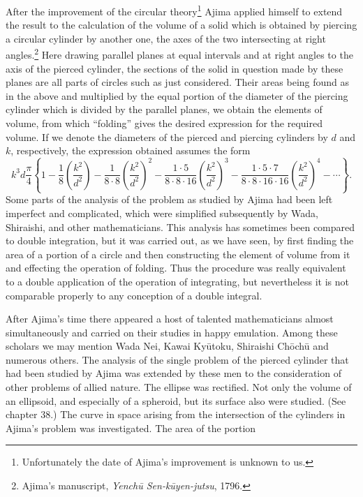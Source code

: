 \documentclass[11pt]{article}
\newcommand{\scanfooter}{}
\begin{document}
After the improvement of the circular theory\footnote{Unfortunately the date of Ajima's improvement is unknown to us.} Ajima applied himself to extend the result to the calculation of the volume of a solid which is obtained by piercing a circular cylinder by another one, the axes of the two intersecting at right angles.\footnote{Ajima's manuscript, \emph{Yenchū Sen-kūyen-jutsu}, 1796.} Here drawing parallel planes at equal intervals and at right angles to the axis of the pierced cylinder, the sections of the solid in question made by these planes are all parts of circles such as just considered. Their areas being found as in the above and multiplied by the equal portion of the diameter of the piercing cylinder which is divided by the parallel planes, we obtain the elements of volume, from which ``folding'' gives the desired expression for the required volume. If we denote the diameters of the pierced and piercing cylinders by $d$ and $k$, respectively, the expression obtained assumes the form
\[
k^3d\frac{\pi}{4}\left\{1-\frac18\left(\frac{k^2}{d^2}\right)
-\frac1{8\cdot8}\left(\frac{k^2}{d^2}\right)^2
-\frac{1\cdot5}{8\cdot8\cdot16}\left(\frac{k^2}{d^2}\right)^3
-\frac{1\cdot5\cdot7}{8\cdot8\cdot16\cdot16}\left(\frac{k^2}{d^2}\right)^4-\cdots\right\}.
\]
Some parts of the analysis of the problem as studied by Ajima had been left imperfect and complicated, which were simplified subsequently by Wada, Shiraishi, and other mathematicians. This analysis has sometimes been compared to double integration, but it was carried out, as we have seen, by first finding the area of a portion of a circle and then constructing the element of volume from it and effecting the operation of folding. Thus the procedure was really equivalent to a double application of the operation of integrating, but nevertheless it is not comparable properly to any conception of a double integral.

After Ajima's time there appeared a host of talented mathematicians almost simultaneously and carried on their studies in happy emulation. Among these scholars we may mention Wada Nei, Kawai Kyūtoku, Shiraishi Chōchū and numerous others. The analysis of the single problem of the pierced cylinder that had been studied by Ajima was extended by these men to the consideration of other problems of allied nature. The ellipse was rectified. Not only the volume of an ellipsoid, and especially of a spheroid, but its surface also were studied. (See chapter 38.) The curve in space arising from the intersection of the cylinders in Ajima's problem was investigated. The area of the portion
\scanfooter
\end{document}
